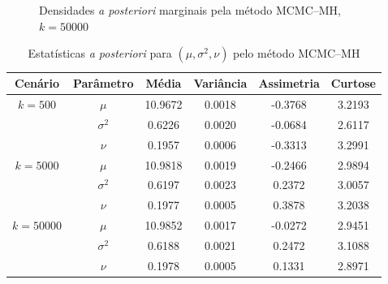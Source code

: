 \documentclass[9pt]{beamer}
\begin{document}
\begin{frame}
\begin{figure}[t]
\caption{Densidades \textit{a posteriori} marginais pela método MCMC--MH, $k = 50000$}%
\end{figure}
\end{frame}
\begin{frame}
\begin{table}[htb]
\caption{Estatísticas \textit{a posteriori} para $(\mu, \sigma^2, \nu)$ pelo método MCMC--MH}
\label{tab3}
\centering
\begin{tabular}{cccccc}
\toprule
Cenário & Parâmetro & Média & Variância & Assimetria & Curtose \\
\midrule
$k = 500$ & $\mu$ & 10.9672 & 0.0018 & -0.3768 & 3.2193 \\
& $\sigma^2$ & 0.6226 & 0.0020 & -0.0684 & 2.6117 \\
& $\nu$      & 0.1957 & 0.0006 & -0.3313 & 3.2991 \\
\midrule
$k = 5000$ & $\mu$ & 10.9818 & 0.0019 & -0.2466 & 2.9894 \\
& $\sigma^2$ & 0.6197 & 0.0023 & 0.2372 & 3.0057 \\
& $\nu$      & 0.1977 & 0.0005 & 0.3878 & 3.2038 \\
\midrule
$k = 50000$ & $\mu$ & 10.9852 & 0.0017 & -0.0272 & 2.9451 \\
& $\sigma^2$ & 0.6188 & 0.0021 & 0.2472 & 3.1088 \\
& $\nu$      & 0.1978 & 0.0005 & 0.1331 & 2.8971 \\
\bottomrule
\end{tabular}
\end{table}
\end{frame}
\end{document}
